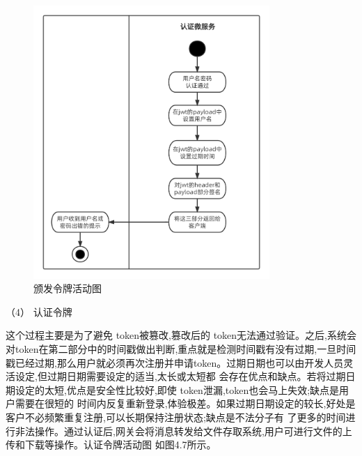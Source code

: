 \begin{figure}[htb]
    \centering
    \includegraphics[width=0.8\textwidth]{my_figures/chapter4/颁发令牌活动图.png}
    \caption{颁发令牌活动图}
    \label{fig:颁发令牌活动图}
\end{figure}

 

（4） 认证令牌


这个过程主要是为了避免 token被篡改,篡改后的 token无法通过验证。之后,系统会对token在第二部分中的时间戳做出判断,重点就是检测时间戳有没有过期,一旦时间
戳已经过期,那么用户就必须再次注册并申请token。过期日期也可以由开发人员灵活设定,但过期日期需要设定的适当,太长或太短都
会存在优点和缺点。若将过期日期设定的太短,优点是安全性比较好,即使 token泄漏,token也会马上失效;缺点是用户需要在很短的
时间内反复重新登录,体验极差。如果过期日期设定的较长,好处是客户不必频繁重复注册,可以长期保持注册状态;缺点是不法分子有
了更多的时间进行非法操作。通过认证后,网关会将消息转发给文件存取系统,用户可进行文件的上传和下载等操作。认证令牌活动图
如图4.7所示。

